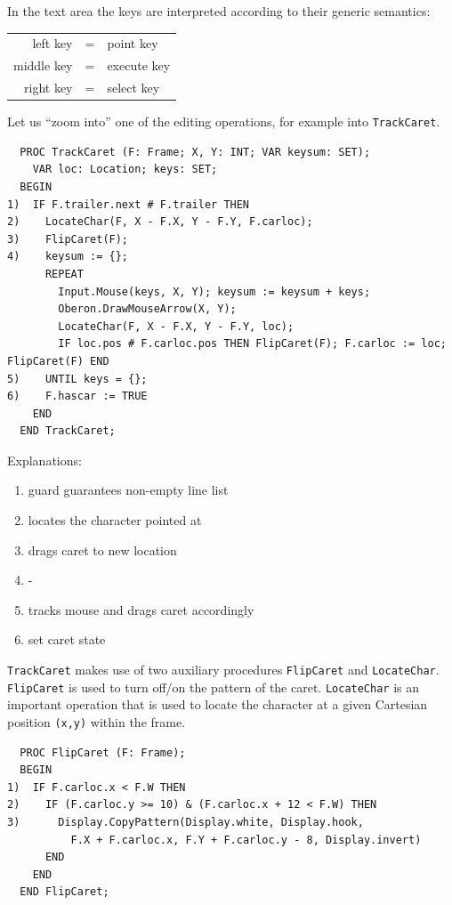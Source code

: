 In the text area the keys are interpreted according to their generic semantics:
\begin{table}[h!]
  \centering
  \begin{tabular}{r c l}
      left key &=& point   key \\
    middle key &=& execute key \\
     right key &=& select  key \\
  \end{tabular}
\end{table}

Let us “zoom into” one of the editing operations, for example into \verb|TrackCaret|.
\begin{verbatim}
  PROC TrackCaret (F: Frame; X, Y: INT; VAR keysum: SET);
    VAR loc: Location; keys: SET;
  BEGIN
1)  IF F.trailer.next # F.trailer THEN
2)    LocateChar(F, X - F.X, Y - F.Y, F.carloc);
3)    FlipCaret(F);
4)    keysum := {};
      REPEAT
        Input.Mouse(keys, X, Y); keysum := keysum + keys;
        Oberon.DrawMouseArrow(X, Y);
        LocateChar(F, X - F.X, Y - F.Y, loc);
        IF loc.pos # F.carloc.pos THEN FlipCaret(F); F.carloc := loc; FlipCaret(F) END
5)    UNTIL keys = {};
6)    F.hascar := TRUE
    END
  END TrackCaret;
\end{verbatim}

Explanations:
\begin{enumerate}
  \item guard guarantees non-empty line list
  \item locates the character pointed at
  \item drags caret to new location
  \item -
  \item tracks mouse and drags caret accordingly
  \item set caret state
\end{enumerate}

\verb|TrackCaret| makes use of two auxiliary procedures \verb|FlipCaret| and \verb|LocateChar|.
\verb|FlipCaret| is used to turn off/on the pattern of the caret. \verb|LocateChar| is an important operation
that is used to locate the character at a given Cartesian position \verb|(x,y)| within the frame.
\begin{verbatim}
  PROC FlipCaret (F: Frame);
  BEGIN
1)  IF F.carloc.x < F.W THEN
2)    IF (F.carloc.y >= 10) & (F.carloc.x + 12 < F.W) THEN
3)      Display.CopyPattern(Display.white, Display.hook,
          F.X + F.carloc.x, F.Y + F.carloc.y - 8, Display.invert)
      END
    END
  END FlipCaret;
\end{verbatim}

